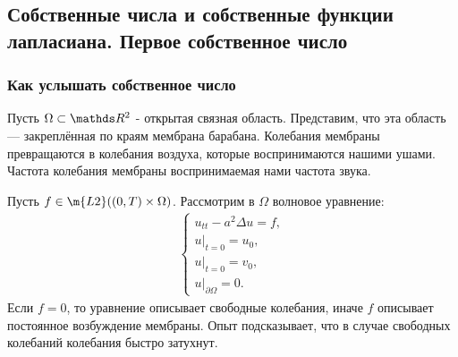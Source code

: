 \subsection{Собственные числа и собственные функции лапласиана. Первое собственное число}
\subsubsection*{Как услышать собственное число}
Пусть $\Omega \subset \real^2$ - открытая связная область. Представим, что эта область --- закреплённая по краям мембрана барабана. Колебания мембраны превращаются в колебания воздуха, которые воспринимаются нашими ушами. Частота колебания мембраны  воспринимаемая нами частота звука.

Пусть $f \in \m{L2}((0,T) \times \Omega)$. Рассмотрим в $\Omega$ волновое уравнение:
\begin{align*}
	\begin{cases*}
		u_{tt} - a^2 \Delta u = f,\\
		u \big\rvert_{t=0} = u_0,\\
		u \big\rvert_{t=0} = v_0,\\
		u \big\rvert_{\partial \Omega} = 0.
	\end{cases*}
\end{align*}
Если $f = 0$, то уравнение описывает свободные колебания, иначе $f$ описывает постоянное возбуждение мембраны. Опыт подсказывает, что в случае свободных колебаний колебания быстро затухнут.

